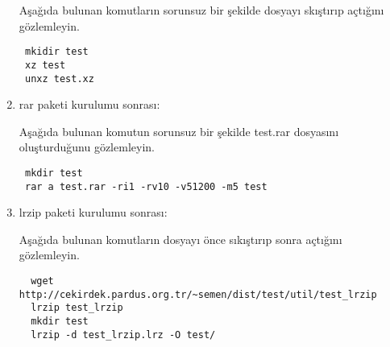 \documentclass[a4paper,10pt]{article}
\begin{document}
\begin{enumerate}
Aşağıda bulunan komutların sorunsuz bir şekilde dosyayı skıştırıp açtığını gözlemleyin.
\begin{verbatim}
 mkidir test
 xz test
 unxz test.xz
\end{verbatim}


\item rar paketi kurulumu sonrası:

Aşağıda bulunan komutun sorunsuz bir şekilde test.rar dosyasını oluşturduğunu gözlemleyin.
\begin{verbatim}
 mkdir test
 rar a test.rar -ri1 -rv10 -v51200 -m5 test
\end{verbatim}


 \item lrzip paketi kurulumu sonrası:

Aşağıda bulunan komutların dosyayı önce sıkıştırıp sonra açtığını gözlemleyin.
\begin{verbatim}
  wget http://cekirdek.pardus.org.tr/~semen/dist/test/util/test_lrzip
  lrzip test_lrzip
  mkdir test
  lrzip -d test_lrzip.lrz -O test/
\end{verbatim}


\end{enumerate}
\end{document}
